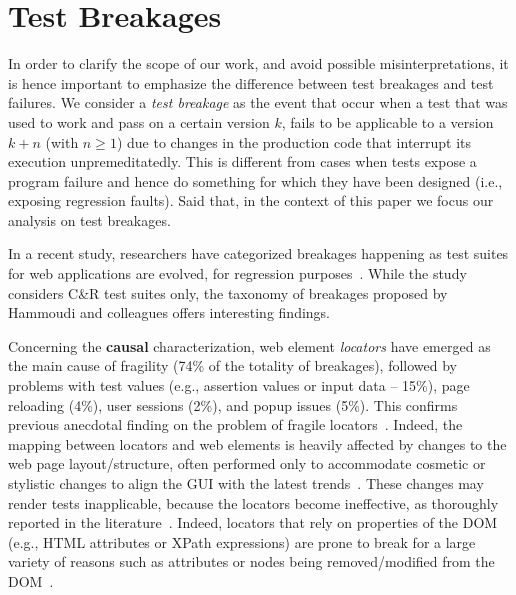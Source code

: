 \section{Test Breakages}\label{sec:breakage-scenarios}

In order to clarify the scope of our work, and avoid possible misinterpretations, it is hence important to emphasize the difference between test breakages and test failures. We consider a \textit{test breakage} as the event that occur when a test that was used to work and pass on a certain version $k$, fails to be applicable to a version $k+n$ (with $n \geq 1$) due to changes in the production code that interrupt its execution unpremeditatedly. %
This is different from cases when tests expose a program failure and hence do something for which they have been designed (i.e., exposing regression faults).
Said that, in the context of this paper we focus our analysis on test breakages.

In a recent study, researchers have categorized breakages happening as test suites for web applications are evolved, for regression purposes~\cite{Hammoudi-2016-ICST}. While the study considers C\&R test suites only, the taxonomy of breakages proposed by Hammoudi and colleagues offers interesting findings. 

Concerning the \textbf{causal} characterization, web element \textit{locators} have emerged as the main cause of fragility (74\% of the totality of breakages), followed by problems with test values (e.g., assertion values or input data -- 15\%), page reloading (4\%), user sessions (2\%), and popup issues (5\%). 
%
This confirms previous anecdotal finding on the problem of fragile locators~\cite{2016-Leotta-JSEP,2014-leotta-WoSAR,Daniel:2011:AGR:2002931.2002937,2013-Ricca-wse}.
%
Indeed, the mapping between locators and web elements is heavily affected by changes to the web page layout/structure, often performed only to accommodate cosmetic or stylistic changes to align the GUI with the latest trends~\cite{2016-leotta-Advances,2016-Leotta-JSEP}. These changes may render tests inapplicable, because the locators become ineffective, as thoroughly reported in the literature~\cite{2016-leotta-Advances,2016-Leotta-JSEP,Choudhary:2011:WWA:2002931.2002935,Hammoudi-2016-ICST,2013-Ricca-wse}. 
Indeed, locators that rely on properties of the DOM (e.g., HTML attributes or XPath expressions) are prone to break for a large variety of reasons such as attributes or nodes being removed/modified from the DOM~\cite{Choudhary:2011:WWA:2002931.2002935}.

